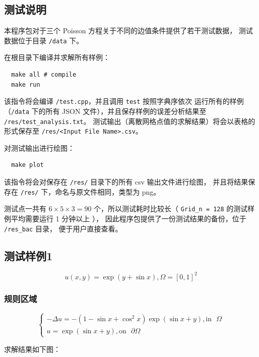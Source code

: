 \documentclass[lang=cn,a4paper,newtx,bibend=bibtex]{elegantpaper}
\begin{document}
\subsection{测试说明}

本程序包对于三个 Poisson 方程关于不同的边值条件提供了若干测试数据，
测试数据位于目录 \texttt{/data} 下。

在根目录下编译并求解所有样例：
\begin{lstlisting}
  make all # compile
  make run
\end{lstlisting}

该指令将会编译 \texttt{/test.cpp}，并且调用 \texttt{test} 按照字典序依次
运行所有的样例（\texttt{/data} 下的所有 JSON 文件），并且保存样例的误差分析结果至 \texttt{/res/test\_analysis.txt}。
测试输出（离散网格点值的求解结果）将会以表格的形式保存至 \texttt{/res/<Input File Name>.csv}。

对测试输出进行绘图：
\begin{lstlisting}
  make plot
\end{lstlisting}

该指令将会对保存在 \texttt{/res/} 目录下的所有 csv 输出文件进行绘图，
并且将结果保存在 \texttt{/res/} 下，命名与原文件相同，类型为 png。

测试点一共有 $6 \times 5 \times 3 = 90$ 个，所以测试耗时比较长（ \texttt{Grid\_n = 128} 的测试样例平均需要运行
 1 分钟以上 ），
因此程序包提供了一份测试结果的备份，位于 \texttt{/res\_bac} 目录，
便于用户直接查看。

\subsection{测试样例1}

\[
  u(x, y) = \exp (y + \sin x), \Omega = [0, 1]^2
\]

\subsubsection{规则区域}


\[
  \begin{cases}
    - \Delta u = -(1 - \sin x + \cos^2 x) \exp(\sin x + y), \text{in~~} \Omega \\
    u = \exp(\sin x + y), \text{on~~} \partial \Omega 
  \end{cases}
\]

求解结果如下图：
\end{document}
